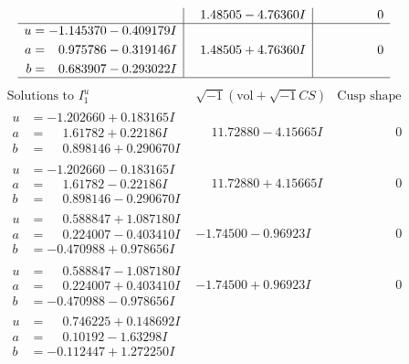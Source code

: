 \documentclass[1p]{elsarticle_modified}
\theoremstyle{definition}
\newcommand{\I}{\sqrt{-1}}
\begin{document}
$$\begin{array}{c|c|c}
 & \phantom{-}1.48505 - 4.76360 I & \phantom{-0.000000 } 0 \\ \hline\begin{aligned}
u &= -1.145370 - 0.409179 I \\
a &= \phantom{-}0.975786 - 0.319146 I \\
b &= \phantom{-}0.683907 - 0.293022 I\end{aligned}
 & \phantom{-}1.48505 + 4.76360 I & \phantom{-0.000000 } 0\\
 \hline 
 \end{array}$$\newpage$$\begin{array}{c|c|c}  
\text{Solutions to }I^u_{1}& \I (\text{vol} + \sqrt{-1}CS) & \text{Cusp shape}\\
 \hline 
\begin{aligned}
u &= -1.202660 + 0.183165 I \\
a &= \phantom{-}1.61782 + 0.22186 I \\
b &= \phantom{-}0.898146 + 0.290670 I\end{aligned}
 & \phantom{-}11.72880 - 4.15665 I & \phantom{-0.000000 } 0 \\ \hline\begin{aligned}
u &= -1.202660 - 0.183165 I \\
a &= \phantom{-}1.61782 - 0.22186 I \\
b &= \phantom{-}0.898146 - 0.290670 I\end{aligned}
 & \phantom{-}11.72880 + 4.15665 I & \phantom{-0.000000 } 0 \\ \hline\begin{aligned}
u &= \phantom{-}0.588847 + 1.087180 I \\
a &= \phantom{-}0.224007 - 0.403410 I \\
b &= -0.470988 + 0.978656 I\end{aligned}
 & -1.74500 - 0.96923 I & \phantom{-0.000000 } 0 \\ \hline\begin{aligned}
u &= \phantom{-}0.588847 - 1.087180 I \\
a &= \phantom{-}0.224007 + 0.403410 I \\
b &= -0.470988 - 0.978656 I\end{aligned}
 & -1.74500 + 0.96923 I & \phantom{-0.000000 } 0 \\ \hline\begin{aligned}
u &= \phantom{-}0.746225 + 0.148692 I \\
a &= \phantom{-}0.10192 - 1.63298 I \\
b &= -0.112447 + 1.272250 I\end{aligned}

\end{array}$$
\end{document}

